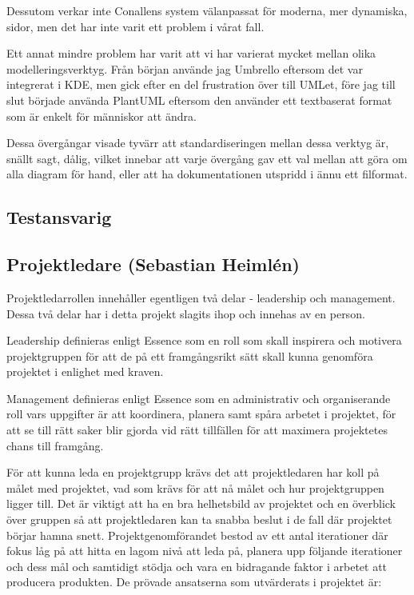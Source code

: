 \documentclass[conference,a4paper]{IEEEtran}
\begin{document}
Dessutom verkar inte Conallens system\cite{Conallen99} välanpassat för moderna, mer dynamiska,
sidor, men det har inte varit ett problem i vårat fall. 

Ett annat mindre problem har varit att vi har varierat mycket mellan olika modelleringsverktyg.
Från början använde jag Umbrello\cite{Umbrello} eftersom det var integrerat i KDE, men gick efter
en del frustration över till UMLet\cite{UMLet}, före jag till slut började använda
PlantUML\cite{PlantUML} eftersom den använder ett textbaserat format som är enkelt för människor att ändra.

Dessa övergångar visade tyvärr att standardiseringen mellan dessa verktyg är, snällt sagt, dålig,
vilket innebar att varje övergång gav ett val mellan att göra om alla diagram för hand, eller att
ha dokumentationen utspridd i ännu ett filformat.

\subsection{Testansvarig}

\subsection{Projektledare (Sebastian Heimlén)}
Projektledarrollen innehåller egentligen två delar - leadership och management. Dessa två delar har i detta projekt slagits ihop och innehas av en person.

Leadership definieras enligt Essence \cite{ivarjacobson2017} som en roll som skall inspirera och motivera projektgruppen för att de på ett framgångsrikt sätt skall kunna genomföra projektet i enlighet med kraven.

Management definieras enligt Essence \cite{ivarjacobson2017} som en administrativ och organiserande roll vars uppgifter är att koordinera, planera samt spåra arbetet i projektet, för att se till rätt saker blir gjorda vid rätt tillfällen för att maximera projektetes chans till framgång.

För att kunna leda en projektgrupp krävs det att projektledaren har koll på målet med projektet, vad som krävs för att nå målet och hur projektgruppen ligger till. Det är viktigt att ha en bra helhetsbild av projektet och en överblick över gruppen så att projektledaren kan ta snabba beslut i de fall där projektet börjar hamna snett. Projektgenomförandet bestod av ett antal iterationer där fokus låg på att hitta en lagom nivå att leda på, planera upp följande iterationer och dess mål och samtidigt stödja och vara en bidragande faktor i arbetet att producera produkten. De prövade ansatserna som utvärderats i projektet är:
\end{document}
